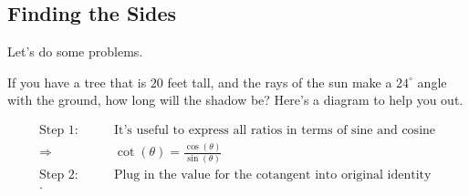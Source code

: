 \subsection{Finding the Sides}
\label{sub_sec:finding_the_sides}

Let's do some problems.

\begin{exc}
  If you have a tree that is $20$ feet tall, and the rays of the sun make a
  $24^{\circ}$ angle with the ground, how long will the shadow be? Here's a
  diagram to help you out.

  \begin{figure}[H]
    \centering
    \caption{}
    \label{fig:tree_diagram}
  \end{figure}

	\solution

	\begin{align*}
		\textrm{Step 1:}\qquad & \textrm{It's useful to express all ratios in terms of sine and cosine} \\
		\Rightarrow\qquad      & \cot(\theta) = \frac{\cos(\theta)}{\sin(\theta)}                       \\
		\textrm{Step 2:}\qquad & \textrm{Plug in the value for the cotangent into original identity}    \\
  .\end{align*}
\end{exc}




\newpage

